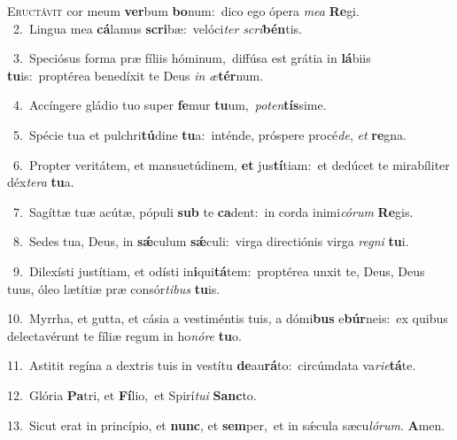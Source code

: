 \lettrine{\initial\textcolor{\initialcolor}{E}}{ructávit} cor meum \textbf{ver}\-bum \textbf{bo}\-num:~\star dico ego ópera \textit{me}\-\textit{a} \textbf{Re}\-gi.\\
{\numbfont\textcolor{\numbcolor}{~2.}}~Lingua mea \textbf{cá}\-lamus \textbf{scri}\-bæ:~\star velóci\textit{ter} \textit{scri}\-\textbf{bén}tis.\par
{\numbfont\textcolor{\numbcolor}{~3.}}~Speciósus forma præ fíliis hóminum,~\dagger diffúsa est grátia in \textbf{lá}\-biis \textbf{tu}\-is:~\star proptérea benedíxit te Deus \textit{in} \textit{æ}\-\textbf{tér}num.\par
{\numbfont\textcolor{\numbcolor}{~4.}}~Accíngere gládio tuo super \textbf{fe}\-mur \textbf{tu}\-um,~\star \textit{pot}\-\textit{en}\textbf{tís}sime.\par
{\numbfont\textcolor{\numbcolor}{~5.}}~Spécie tua et pulchri\-\textbf{tú}\-dine \textbf{tu}\-a:~\star inténde, próspere procé\-\textit{de}\-, \textit{et} \textbf{re}\-gna.\par
{\numbfont\textcolor{\numbcolor}{~6.}}~Propter veritátem, et mansuetúdinem, \textbf{et} jus\-\textbf{tí}\-tiam:~\star et dedúcet te mirabíliter déx\-\textit{te}\-\textit{ra} \textbf{tu}\-a.\par
{\numbfont\textcolor{\numbcolor}{~7.}}~Sagíttæ tuæ acútæ, pópuli \textbf{sub} te \textbf{ca}\-dent:~\star in corda inimi\-\textit{có}\-\textit{rum} \textbf{Re}\-gis.\par
{\numbfont\textcolor{\numbcolor}{~8.}}~Sedes tua, Deus, in \textbf{sǽ}\-culum \textbf{sǽ}\-culi:~\star virga directiónis virga \textit{re}\-\textit{gni} \textbf{tu}\-i.\par
{\numbfont\textcolor{\numbcolor}{~9.}}~Dilexísti justítiam, et odísti in\-\textbf{i}\-qui\-\textbf{tá}\-tem:~\star proptérea unxit te, Deus, Deus tuus, óleo lætítiæ præ consór\-\textit{ti}\-\textit{bus} \textbf{tu}\-is.\par
{\numbfont\textcolor{\numbcolor}{10.}}~Myrrha, et gutta, et cásia a vestiméntis tuis, a dómi\textbf{bus} e\-\textbf{búr}\-neis:~\star ex quibus delectavérunt te fíliæ regum in ho\-\textit{nó}\-\textit{re} \textbf{tu}\-o.\par
{\numbfont\textcolor{\numbcolor}{11.}}~Astitit regína a dextris tuis in vestítu \textbf{de}\-au\-\textbf{rá}\-to:~\star circúmdata va\-\textit{ri}\-\textit{e}\textbf{tá}te.\par
{\numbfont\textcolor{\numbcolor}{12.}}~Glória \textbf{Pa}\-tri, et \textbf{Fí}\-lio,~\star et Spirí\-\textit{tu}\-\textit{i} \textbf{Sanc}\-to.\par
{\numbfont\textcolor{\numbcolor}{13.}}~Sicut erat in princípio, et \textbf{nunc}\-, et \textbf{sem}\-per,~\star et in sǽcula sæcu\-\textit{ló}\-\textit{rum}. \textbf{A}\-men.\par
